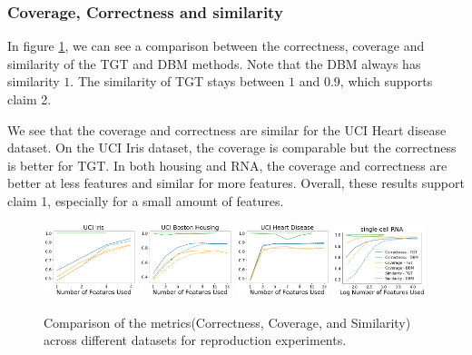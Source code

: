 \subsubsection{Coverage, Correctness and similarity}
In figure \ref{fig:reproduced_tgt_metrics}, we can see a comparison between the correctness, coverage and similarity of the TGT and DBM methods. Note that the DBM always has similarity $1$. The similarity of TGT stays between $1$ and $0.9$, which supports claim 2. 

We see that the coverage and correctness are similar for the UCI Heart disease dataset. On the UCI Iris dataset, the coverage is comparable but the correctness is better for TGT. In both housing and RNA, the coverage and correctness are better at less features and similar for more features. Overall, these results support claim 1, especially for a small amount of features.
\begin{figure}[H]
    \includegraphics[width=0.24\textwidth]{../openreview/images/tffigures/iris-tradeoff.png}
    \includegraphics[width=0.24\textwidth]{../openreview/images/tffigures/housing-tradeoff.png}
    \includegraphics[width=0.24\textwidth]{../openreview/images/tffigures/heart-tradeoff.png}
    \includegraphics[width=0.24\textwidth]{../openreview/images/tffigures/bipolar-tradeoff.png}
    \caption{Comparison of the metrics(Correctness, Coverage, and Similarity) across different datasets for reproduction experiments.}
    \label{fig:reproduced_tgt_metrics}
\end{figure}
